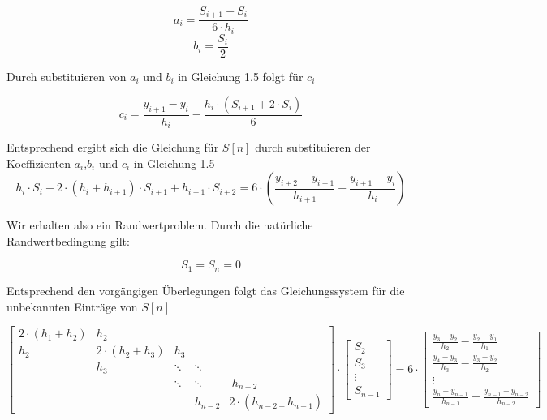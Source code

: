 \documentclass[12pt,titlepage]{article}
\begin{document}
\begin{equation*}
    a_i = \frac{S_{i+1}-S_i}{6\cdot h_i}
\end{equation*}
\newline
\begin{equation}
    b_i = \frac{S_i}{2}
\end{equation}
\newline

Durch substituieren von $a_i$ und $b_i$ in Gleichung 1.5 folgt für $c_i$
\newline

\begin{equation}
    c_i = \frac{y_{i+1}-y_i}{h_i}-\frac{h_i\cdot (S_{i+1}+2\cdot S_i)}{6}
\end{equation}
\newline

Entsprechend ergibt sich die Gleichung für $S[n]$ durch substituieren der Koeffizienten $a_i$,$b_i$ und $c_i$ in Gleichung 1.5
\begin{equation}
    h_i\cdot S_i+2\cdot (h_i+h_{i+1})\cdot S_{i+1} + h_{i+1}\cdot S_{i+2} = 6\cdot (\frac{y_{i+2}-y_{i+1}}{h_{i+1}}-\frac{y_{i+1}-y_{i}}{h_{i}})
\end{equation}
\newline

Wir erhalten also ein Randwertproblem. Durch die natürliche Randwertbedingung gilt:
\newline

\begin{equation}
    S_1 = S_n = 0
\end{equation}
\newline

Entsprechend den vorgängigen Überlegungen folgt das Gleichungssystem für die unbekannten Einträge von $S[n]$
\newline

\begin{equation}
    \begin{bmatrix}
        2\cdot (h_1+h_2) & h_2 \\
        h_2 & 2\cdot (h_2+h_3) & h_3 \\
        & h_3 & \ddots & \ddots \\ 
        && \ddots & \ddots &\ h_{n-2}\\
        &&& h_{n-2} & 2\cdot (h_{n-2+}h_{n-1})
    \end{bmatrix}
    \cdot
    \begin{bmatrix}
        S_2\\
        S_3 \\
        \vdots\\ 
        S_{n-1}
    \end{bmatrix}
    =
    6\cdot
    \begin{bmatrix}
        \frac{y_3-y_2}{h_2}-\frac{y_2-y_1}{h_1}\\
        \frac{y_4-y_3}{h_3}-\frac{y_3-y_2}{h_2} \\
        \vdots\\ 
        \frac{y_{n}-y_{n-1}}{h_{n-1}}-\frac{y_{n-1}-y_{n-2}}{h_{n-2}}
    \end{bmatrix}
\end{equation}
\newline
\newpage
\end{document}
